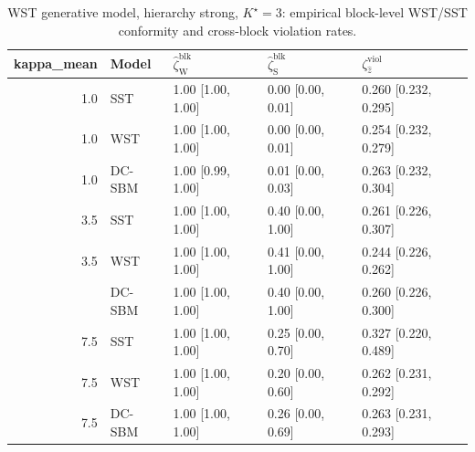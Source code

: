 \begin{table}
\centering
\caption{WST generative model, hierarchy strong, $K^\star=3$: empirical block-level WST/SST conformity and cross-block violation rates.}
\centering
\begin{tabular}[t]{rllll}
\toprule
kappa_mean & Model & $\widehat\zeta_{\mathrm{W}}^{\mathrm{blk}}$ & $\widehat\zeta_{\mathrm{S}}^{\mathrm{blk}}$ & $\zeta^{\mathrm{viol}}_{\hat z}$\\
\midrule
1.0 & SST & 1.00 [1.00, 1.00] & 0.00 [0.00, 0.01] & 0.260 [0.232, 0.295]\\
1.0 & WST & 1.00 [1.00, 1.00] & 0.00 [0.00, 0.01] & 0.254 [0.232, 0.279]\\
1.0 & DC-SBM & 1.00 [0.99, 1.00] & 0.01 [0.00, 0.03] & 0.263 [0.232, 0.304]\\
3.5 & SST & 1.00 [1.00, 1.00] & 0.40 [0.00, 1.00] & 0.261 [0.226, 0.307]\\
3.5 & WST & 1.00 [1.00, 1.00] & 0.41 [0.00, 1.00] & 0.244 [0.226, 0.262]\\
\addlinespace
3.5 & DC-SBM & 1.00 [1.00, 1.00] & 0.40 [0.00, 1.00] & 0.260 [0.226, 0.300]\\
7.5 & SST & 1.00 [1.00, 1.00] & 0.25 [0.00, 0.70] & 0.327 [0.220, 0.489]\\
7.5 & WST & 1.00 [1.00, 1.00] & 0.20 [0.00, 0.60] & 0.262 [0.231, 0.292]\\
7.5 & DC-SBM & 1.00 [1.00, 1.00] & 0.26 [0.00, 0.69] & 0.263 [0.231, 0.293]\\
\bottomrule
\end{tabular}
\end{table}
